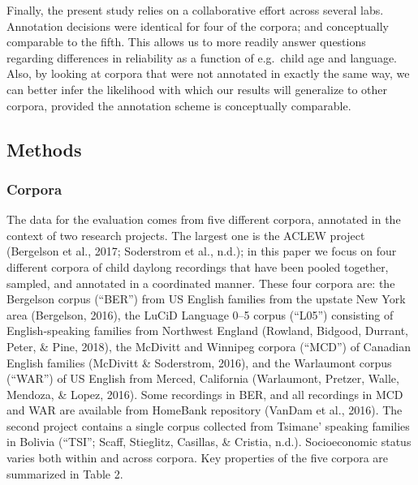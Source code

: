\documentclass[english,table,man,floatsintext]{apa6}
\begin{document}
Finally, the present study relies on a collaborative effort across several labs. Annotation decisions were identical for four of the corpora; and conceptually comparable to the fifth. This allows us to more readily answer questions regarding differences in reliability as a function of e.g.~child age and language. Also, by looking at corpora that were not annotated in exactly the same way, we can better infer the likelihood with which our results will generalize to other corpora, provided the annotation scheme is conceptually comparable.

\hypertarget{methods}{%
\subsection{Methods}\label{methods}}

\hypertarget{corpora}{%
\subsubsection{Corpora}\label{corpora}}

The data for the evaluation comes from five different corpora, annotated in the context of two research projects. The largest one is the ACLEW project (Bergelson et al., 2017; Soderstrom et al., n.d.); in this paper we focus on four different corpora of child daylong recordings that have been pooled together, sampled, and annotated in a coordinated manner. These four corpora are: the Bergelson corpus (\enquote{BER}) from US English families from the upstate New York area (Bergelson, 2016), the LuCiD Language 0--5 corpus (\enquote{L05}) consisting of English-speaking families from Northwest England (Rowland, Bidgood, Durrant, Peter, \& Pine, 2018), the McDivitt and Winnipeg corpora (\enquote{MCD}) of Canadian English families (McDivitt \& Soderstrom, 2016), and the Warlaumont corpus (\enquote{WAR}) of US English from Merced, California (Warlaumont, Pretzer, Walle, Mendoza, \& Lopez, 2016). Some recordings in BER, and all recordings in MCD and WAR are available from HomeBank repository (VanDam et al., 2016). The second project contains a single corpus collected from Tsimane' speaking families in Bolivia (``TSI''; Scaff, Stieglitz, Casillas, \& Cristia, n.d.). Socioeconomic status varies both within and across corpora. Key properties of the five corpora are summarized in Table 2.
\end{document}
